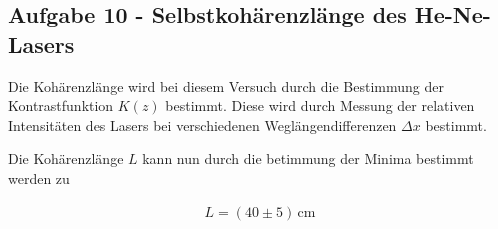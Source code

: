 \subsection*{Aufgabe 10 - Selbstkohärenzlänge des He-Ne-Lasers}
Die Kohärenzlänge wird bei diesem Versuch durch die Bestimmung der Kontrastfunktion $K(z)$ bestimmt. Diese wird durch Messung der relativen Intensitäten des Lasers bei verschiedenen Weglängendifferenzen $\Delta x$ bestimmt.

Die Kohärenzlänge $L$ kann nun durch die betimmung der Minima bestimmt werden zu

\begin{align}
L = (40 \pm 5)\, \text{cm}
\end{align}
